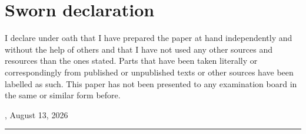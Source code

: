 \chapter*{Sworn declaration}

\pagestyle{plain}

I declare under oath that I have prepared the paper at hand independently and without the help of others and that I have not used any other sources and resources than the ones stated. Parts that have been taken literally or correspondingly from published or unpublished texts or other sources have been labelled as such. This paper has not been presented to any examination board in the same or similar form before.

\vfill

\vspace*{\baselineskip}
\noindent \begin{minipage}{\textwidth}
	\noindent \begin{minipage}{0.49\textwidth}
		\begin{flushleft}
			, August 13, 2026
		\end{flushleft}
	\end{minipage} \hfill
	\begin{minipage}{0.49\textwidth}
		\begin{flushright}
			\rule{4cm}{0.5pt}
		\end{flushright}
	\end{minipage}
\end{minipage}

\newpage